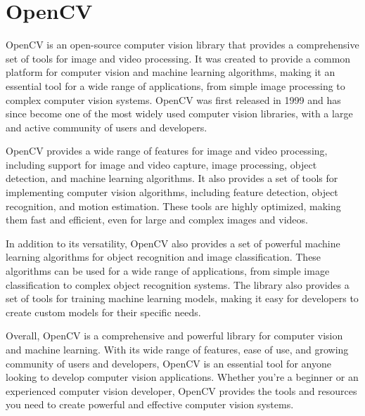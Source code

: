 \section{OpenCV}
OpenCV is an open-source computer vision library that provides a comprehensive set of tools for image and video processing. It was created to provide a common platform for computer vision and machine learning algorithms, making it an essential tool for a wide range of applications, from simple image processing to complex computer vision systems. OpenCV was first released in 1999 and has since become one of the most widely used computer vision libraries, with a large and active community of users and developers.

OpenCV provides a wide range of features for image and video processing, including support for image and video capture, image processing, object detection, and machine learning algorithms. It also provides a set of tools for implementing computer vision algorithms, including feature detection, object recognition, and motion estimation. These tools are highly optimized, making them fast and efficient, even for large and complex images and videos.

In addition to its versatility, OpenCV also provides a set of powerful machine learning algorithms for object recognition and image classification. These algorithms can be used for a wide range of applications, from simple image classification to complex object recognition systems. The library also provides a set of tools for training machine learning models, making it easy for developers to create custom models for their specific needs.

Overall, OpenCV is a comprehensive and powerful library for computer vision and machine learning. With its wide range of features, ease of use, and growing community of users and developers, OpenCV is an essential tool for anyone looking to develop computer vision applications. Whether you're a beginner or an experienced computer vision developer, OpenCV provides the tools and resources you need to create powerful and effective computer vision systems.